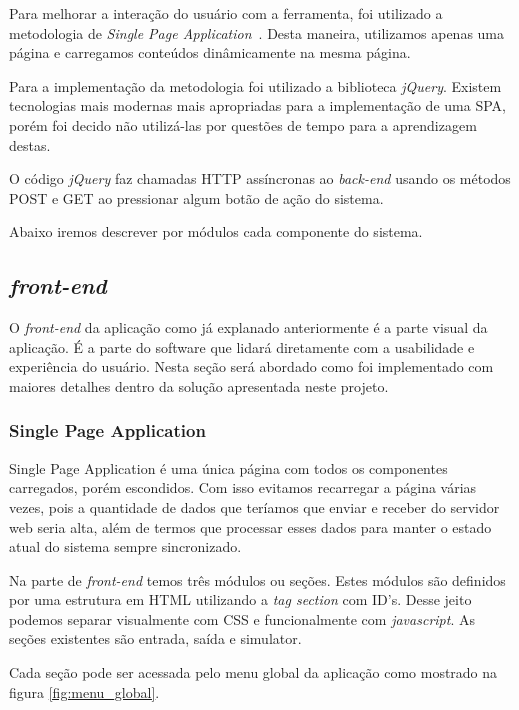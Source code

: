 	Para melhorar a interação do usuário com a ferramenta, foi utilizado a metodologia de \textit{Single Page Application}~\cite{mikowski2013single}. Desta maneira, utilizamos apenas uma página e carregamos conteúdos dinâmicamente na mesma página.

	Para a implementação da metodologia foi utilizado a biblioteca \textit{jQuery}. Existem tecnologias mais modernas mais apropriadas para a implementação de uma SPA, porém foi decido não utilizá-las por questões de tempo para a aprendizagem destas.

	O código \textit{jQuery} faz chamadas HTTP assíncronas ao \textit{back-end} usando os métodos POST e GET ao pressionar algum botão de ação do sistema. 

	Abaixo iremos descrever por módulos cada componente do sistema.
	
	\subsection{\textit{front-end}}
	
		O \textit{front-end} da aplicação como já explanado anteriormente é a parte visual da aplicação. É a parte do software que lidará diretamente com a usabilidade e experiência do usuário. Nesta seção será abordado como foi implementado com maiores detalhes dentro da solução apresentada neste projeto.

		\subsubsection{Single Page Application}
		
			Single Page Application é uma única página com todos os componentes carregados, porém escondidos. Com isso evitamos recarregar a página várias vezes, pois a quantidade de dados que teríamos que  enviar e receber do servidor web seria alta, além de termos que processar esses dados para manter o estado atual do sistema sempre sincronizado.

			Na parte de \textit{front-end} temos três módulos ou seções. Estes módulos são definidos por uma estrutura em HTML utilizando a \textit{tag section} com ID's. Desse jeito podemos separar visualmente com CSS e funcionalmente com \textit{javascript}. As seções existentes são entrada, saída e simulator.

			Cada seção pode ser acessada pelo menu global da aplicação como mostrado na figura \ref{fig:menu_global}.

